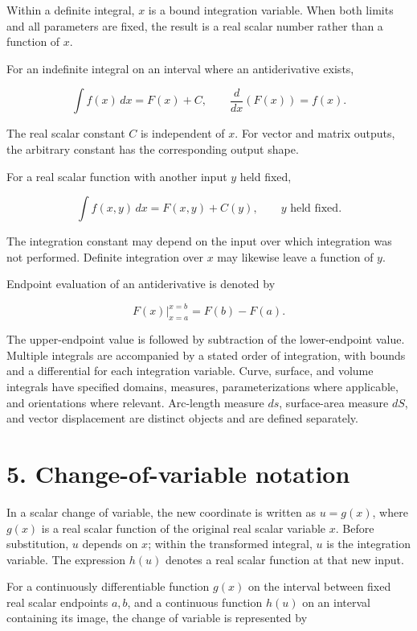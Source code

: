 \documentclass[11pt,oneside,openany]{book}
\begin{document}
Within a definite integral, \(x\) is a bound integration variable. When
both limits and all parameters are fixed, the result is a real scalar
number rather than a function of \(x\).

For an indefinite integral on an interval where an antiderivative exists,

\[
\int f(x)\,dx=F(x)+C,
\qquad \frac{d}{dx}\left(F(x)\right)=f(x).
\]

The real scalar constant \(C\) is independent of \(x\). For vector and matrix
outputs, the arbitrary constant has the corresponding output shape.

For a real scalar function with another input \(y\) held fixed,

\[
\int f(x,y)\,dx=F(x,y)+C(y),\qquad y\text{ held fixed}.
\]

The integration constant may depend on the input over which integration
was not performed. Definite integration over \(x\) may likewise leave a
function of \(y\).

Endpoint evaluation of an antiderivative is denoted by

\[
\left.F(x)\right|_{x=a}^{x=b}=F(b)-F(a).
\]

The upper-endpoint value is followed by subtraction of the lower-endpoint
value. Multiple integrals are accompanied by a stated order of integration,
with bounds and a differential for each integration variable. Curve,
surface, and volume integrals have specified domains, measures,
parameterizations where applicable, and orientations where relevant.
Arc-length measure \(ds\), surface-area measure \(dS\), and vector displacement
are distinct objects and are defined separately.
\clearpage

\section{5. Change-of-variable notation}

In a scalar change of variable, the new coordinate is written as
\(u=g(x)\), where \(g(x)\) is a real scalar function of the original real
scalar variable \(x\). Before substitution, \(u\) depends on \(x\); within the
transformed integral, \(u\) is the integration variable. The expression
\(h(u)\) denotes a real scalar function at that new input.

For a continuously differentiable function \(g(x)\) on the interval between
fixed real scalar endpoints \(a,b\), and a continuous function \(h(u)\) on an
interval containing its image, the change of variable is represented by
\end{document}
